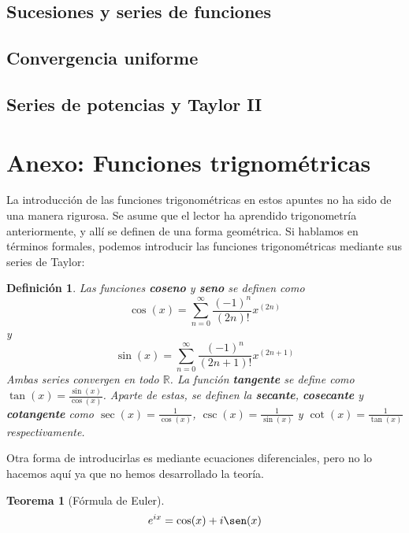 \documentclass{article}
\newtheorem{theorem}{Teorema}
\newtheorem{define}{Definición}
\newcommand{\reales}{\mathbb{R}}
\begin{document}
\subsection{Sucesiones y series de funciones}

\subsection{Convergencia uniforme}

\subsection{Series de potencias y Taylor II}


\newpage
\section{Anexo: Funciones trignométricas}
La introducción de las funciones trigonométricas en estos apuntes no ha sido de una manera rigurosa. Se asume que el lector ha aprendido trigonometría anteriormente, y allí se definen de una forma geométrica. Si hablamos en términos formales, podemos introducir las funciones trigonométricas mediante sus series de Taylor:

\begin{define}
	Las funciones \textbf{coseno} y \textbf{seno} se definen como
	\begin{equation*}
		\cos(x) = \sum_{n=0}^{\infty} \frac{(-1)^n}{(2n)!} x^{(2n)}
	\end{equation*}
	y
	\begin{equation*}
		\sin(x) = \sum_{n=0}^{\infty} \frac{(-1)^n}{(2n+1)!} x^{(2n+1)}
	\end{equation*}
	Ambas series convergen en todo $\reales$.
	La función \textbf{tangente} se define como $\tan(x) = \frac{\sin(x)}{\cos(x)}$.
	Aparte de estas, se definen la \textbf{secante}, \textbf{cosecante} y \textbf{cotangente} como $\sec(x) = \frac{1}{\cos(x)}$, $\csc(x) = \frac{1}{\sin(x)}$ y $\cot(x) = \frac{1}{\tan(x)}$ respectivamente.
\end{define}

Otra forma de introducirlas es mediante ecuaciones diferenciales, pero no lo hacemos aquí ya que no hemos desarrollado la teoría.\\ 

\begin{theorem}[Fórmula de Euler]
	\begin{equation*}
		e^{ix} = \cos(x) + i\sen(x)
	\end{equation*}
\end{theorem}
\end{document}
